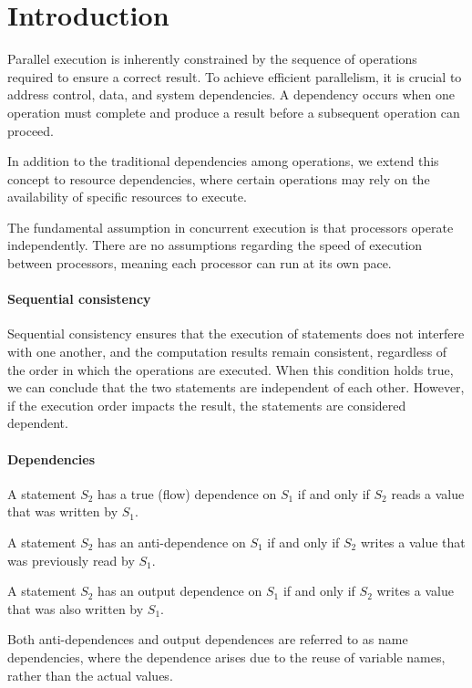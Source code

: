 \section{Introduction}

Parallel execution is inherently constrained by the sequence of operations required to ensure a correct result. 
To achieve efficient parallelism, it is crucial to address control, data, and system dependencies. 
A dependency occurs when one operation must complete and produce a result before a subsequent operation can proceed.

In addition to the traditional dependencies among operations, we extend this concept to resource dependencies, where certain operations may rely on the availability of specific resources to execute.

The fundamental assumption in concurrent execution is that processors operate independently. 
There are no assumptions regarding the speed of execution between processors, meaning each processor can run at its own pace.

\paragraph*{Sequential consistency}
Sequential consistency ensures that the execution of statements does not interfere with one another, and the computation results remain consistent, regardless of the order in which the operations are executed.
When this condition holds true, we can conclude that the two statements are independent of each other. 
However, if the execution order impacts the result, the statements are considered dependent.

\paragraph*{Dependencies}
\begin{definition}
    A statement $S_2$ has a true (flow) dependence on $S_1$ if and only if $S_2$ reads a value that was written by $S_1$.
\end{definition}
\begin{definition}
    A statement $S_2$ has an anti-dependence on $S_1$ if and only if $S_2$ writes a value that was previously read by $S_1$.
\end{definition}
\begin{definition}
    A statement $S_2$ has an output dependence on $S_1$ if and only if $S_2$ writes a value that was also written by $S_1$.
\end{definition}
Both anti-dependences and output dependences are referred to as name dependencies, where the dependence arises due to the reuse of variable names, rather than the actual values.

